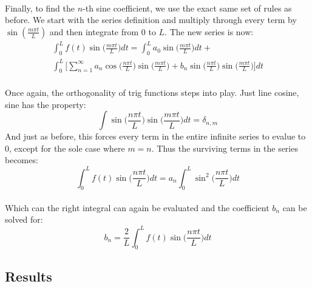 \documentclass[12pt,letterpaper]{article}
\begin{document}
\paragraph*{}Finally, to find the $n$-th sine coefficient, we use the exact same set of rules as before. We start with the series definition and multiply through every term by $\sin(\frac{m\pi t}{L})$ and then integrate from $0$ to $L$. The new series is now:
\begin{multline}
\label{step3}
\int_0^L f(t)\sin\Big(\frac{m\pi t}{L}\Big) dt = 
\int_0^L a_0\sin\Big(\frac{m\pi t}{L}\Big) dt +  \\
\int_0^L \Bigg[ \sum_{n=1}^{\infty} 
a_n \cos\Big(\frac{n\pi t}{L}\Big)\sin\Big(\frac{m\pi t}{L}\Big) + 
b_n \sin\Big(\frac{n\pi t}{L}\Big)\sin\Big(\frac{m\pi t}{L}\Big) \Bigg] dt
\end{multline}
\paragraph*{}Once again, the orthogonality of trig functions steps into play. Just line cosine, sine has the property:
\begin{equation}
\label{othog1}
\int \sin\Big(\frac{n\pi t}{L}\Big)\sin\Big(\frac{m\pi t}{L}\Big) dt = \delta_{n,m}
\end{equation}
And just as before, this forces every term in the entire infinite series to evalue to $0$, except for the sole case where $m = n$. Thus the surviving terms in the series becomes:
\begin{equation}
\int_0^L f(t)\sin\Big(\frac{n\pi t}{L}\Big) dt = 
a_n \int_0^L \sin^2\Big(\frac{n\pi t}{L}\Big) dt
\end{equation}
\paragraph*{}Which can the right integral can again be evaluated and the coefficient $b_n$ can be solved for:
\begin{equation}
\label{b_n}
b_n = \frac{2}{L}\int_0^L f(t) \sin\Big(\frac{n\pi t}{L}\Big) dt
\end{equation}


\subsection{Results}
\end{document}
